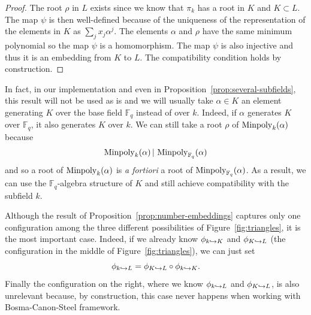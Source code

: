 \begin{proof}
  The root $\rho$ in $L$ exists since we know that $\pi_k$ has a root in $K$
  and $K\subset L$. The map $\psi$ is then well-defined because of the uniqueness of the
  representation of the elements in $K$ as $\sum_jx_j\alpha^j$. The elements
  $\alpha$ and $\rho$ have the same minimum polynomial so the map $\psi$ is a
  homomorphism. The map $\psi$ is also injective and thus it is an embedding
  from $K$ to $L$. The compatibility condition holds by construction.
\end{proof}
\begin{rem}
\label{rem:base-field}

In fact, in our implementation and even in
Proposition~\ref{prop:several-subfields}, this result will not be used as is and
we will usually take $\alpha\in K$ an element generating $K$ over the base
field $\mathbb{F}_q$ instead of over $k$. Indeed, if $\alpha$ generates $K$
over $\mathbb{F}_q$, it also generates $K$ over $k$. We can still take a root
$\rho$ of $\operatorname{Minpoly}_{k}(\alpha)$ because
\[
  \operatorname{Minpoly}_k(\alpha)\,|\,\operatorname{Minpoly}_{\mathbb{F}_q}(\alpha)
\]
and so a root of $\operatorname{Minpoly}_{k}(\alpha)$ is \emph{a fortiori} a root of
$\operatorname{Minpoly}_{\mathbb{F}_q}(\alpha)$. As a result, we can use the
$\mathbb{F}_q$-algebra structure of $K$ and still achieve compatibility with
the subfield $k$.
\end{rem}
Although the result of Proposition~\ref{prop:number-embeddings} captures only
one configuration among the three different possibilities of
Figure~\ref{fig:triangles}, it is the most important case. Indeed, if we
already know $\phi_{k\hookrightarrow K}$ and $\phi_{K\hookrightarrow L}$ (the configuration in the
middle of Figure~\ref{fig:triangles}), we can just set
\[
  \phi_{k\hookrightarrow L} = \phi_{K\hookrightarrow L}\circ\phi_{k\hookrightarrow K}.
\]
Finally the configuration on the right, where we know $\phi_{k\hookrightarrow L}$ and
$\phi_{K\hookrightarrow L}$, is also unrelevant because, by construction, this case never
happens when working with Bosma-Canon-Steel framework.
